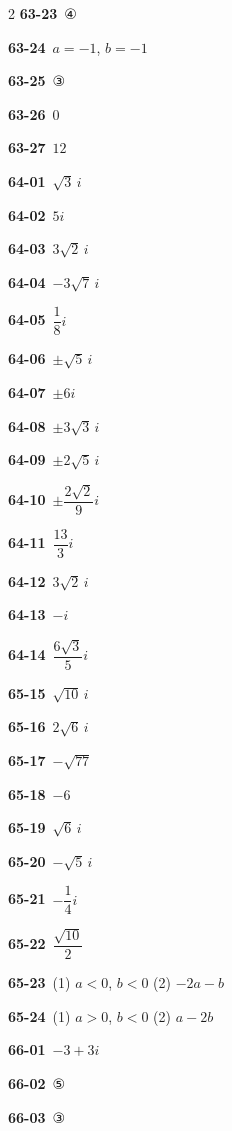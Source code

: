 \documentclass[10pt,a4paper]{article}
\begin{document}
\begin{multicols}{2}
\noindent\textbf{63-23}\ ④\par
\noindent\textbf{63-24}\ $a=-1$, $b=-1$\par
\noindent\textbf{63-25}\ ③\par
\noindent\textbf{63-26}\ $0$\par
\noindent\textbf{63-27}\ $12$\par
\noindent\textbf{64-01}\ $\sqrt{3}\,i$\par
\noindent\textbf{64-02}\ $5i$\par
\noindent\textbf{64-03}\ $3\sqrt{2}\,i$\par
\noindent\textbf{64-04}\ $-3\sqrt{7}\,i$\par
\noindent\textbf{64-05}\ $\dfrac{1}{8}i$\par
\noindent\textbf{64-06}\ $\pm\sqrt{5}\,i$\par
\noindent\textbf{64-07}\ $\pm 6i$\par
\noindent\textbf{64-08}\ $\pm 3\sqrt{3}\,i$\par
\noindent\textbf{64-09}\ $\pm 2\sqrt{5}\,i$\par
\noindent\textbf{64-10}\ $\pm\dfrac{2\sqrt{2}}{9}i$\par
\noindent\textbf{64-11}\ $\dfrac{13}{3}i$\par
\noindent\textbf{64-12}\ $3\sqrt{2}\,i$\par
\noindent\textbf{64-13}\ $-i$\par
\noindent\textbf{64-14}\ $\dfrac{6\sqrt{3}}{5}i$\par
\noindent\textbf{65-15}\ $\sqrt{10}\,i$\par
\noindent\textbf{65-16}\ $2\sqrt{6}\,i$\par
\noindent\textbf{65-17}\ $-\sqrt{77}$\par
\noindent\textbf{65-18}\ $-6$\par
\noindent\textbf{65-19}\ $\sqrt{6}\,i$\par
\noindent\textbf{65-20}\ $-\sqrt{5}\,i$\par
\noindent\textbf{65-21}\ $-\dfrac{1}{4}i$\par
\noindent\textbf{65-22}\ $\dfrac{\sqrt{10}}{2}$\par
\noindent\textbf{65-23}\ (1) $a<0$, $b<0$ (2) $-2a-b$\par
\noindent\textbf{65-24}\ (1) $a>0$, $b<0$ (2) $a-2b$\par
\noindent\textbf{66-01}\ $-3+3i$\par
\noindent\textbf{66-02}\ ⑤\par
\noindent\textbf{66-03}\ ③\par

\end{multicols}
\end{document}
